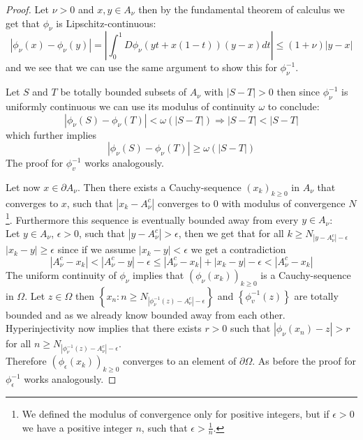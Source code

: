 \documentclass[11pt,a4paper,leqno]{report}
\numberwithin{equation}{chapter}
\begin{document}
\begin{proof}
Let $\nu>0$ and $x,y\in A_\nu$ then by the fundamental theorem of calculus we get that $\phi_\nu$ is Lipschitz-continuous:
\begin{equation*}|\phi_\nu(x)-\phi_\nu(y)|=|\int_0^1D\phi_\nu(yt+x(1-t))(y-x)dt|\leq (1+\nu)|y-x|\end{equation*}
and we see that we can use the same argument to show this for $\phi_\nu^{-1}$.

Let $S$ and $T$ be totally bounded subsets of $A_\nu$ with $ |S-T|>0$ then since $\phi_\nu^{-1}$ is uniformly continuous we can use its modulus of continuity $\omega$ to conclude:
\begin{equation*} |\phi_\nu(S)-\phi_\nu(T)|<\omega(|S-T|)\Rightarrow |S-T|<|S-T|\end{equation*}
which further implies \begin{equation*}|\phi_\nu(S)-\phi_\nu(T)|\geq\omega(|S-T|)\end{equation*}
The proof for $\phi_v^{-1}$ works analogously.

Let now $x\in \partial A_\nu$. Then there exists a Cauchy-sequence $(x_k)_{k\geq 0}$ in $A_\nu$ that converges to $x$, such that $|x_k-A_\nu^c|$ converges to $0$ with modulus of convergence $N$ \footnote{We defined the modulus of convergence only for positive integers, but if $\epsilon>0$ we have a positive integer $n$, such that $\epsilon>\frac{1}{n}$.}.
Furthermore this sequence is eventually bounded away from every $y\in A_\nu$: \\
Let $y\in A_\nu$, $\epsilon>0$, such that $|y-A_\nu^c|>\epsilon$, then we get that for all $k\geq N_{|y-A_\nu^c|-\epsilon}$ $|x_k-y|\geq\epsilon$ since if we assume $|x_k-y|<\epsilon$ we get a contradiction
\begin{equation*} |A_\nu^c-x_k|<|A_\nu^c-y|-\epsilon\leq |A_\nu^c-x_k|+|x_k-y|-\epsilon<|A_\nu^c-x_k|\end{equation*}
The uniform continuity of $\phi_\nu$ implies that $(\phi_\nu(x_k))_{k\geq 0}$ is a Cauchy-sequence in $\Omega$.
Let $z\in\Omega$ then $\left\{x_n: n\geq N_{|\phi_\nu^{-1}(z)-A_\nu^c|-\epsilon}\right\}$ and $\left\{\phi_v^{-1}(z)\right\}$ are totally bounded and as we already know bounded away from each other.
Hyperinjectivity now implies that there exists $r>0$ such that $|\phi_\nu(x_n)-z|>r$ for all $n\geq N_{|\phi_\nu^{-1}(z)-A_\nu^c|-\epsilon}$.\\
Therefore $(\phi_\epsilon(x_k))_{k\geq 0}$ converges to an element of $\partial\Omega$. 
As before the proof for $\phi_\epsilon^{-1}$ works analogously. %
\end{proof}
\end{document}
